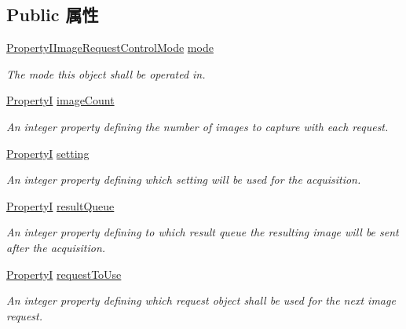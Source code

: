 \subsection*{Public 属性}
\begin{DoxyCompactItemize}
\item 
\hyperlink{group___common_interface_ga2dbb98d2580189d140e11115331f0416}{Property\+I\+Image\+Request\+Control\+Mode} \hyperlink{classmv_i_m_p_a_c_t_1_1acquire_1_1_image_request_control_a4fb0601747fb8feca1eaaed923faab37}{mode}
\begin{DoxyCompactList}\small\item\em The mode this object shall be operated in. \end{DoxyCompactList}\item 
\hyperlink{group___common_interface_ga12d5e434238ca242a1ba4c6c3ea45780}{Property\+I} \hyperlink{classmv_i_m_p_a_c_t_1_1acquire_1_1_image_request_control_a552b30507980db8ad253bc773cb83991}{image\+Count}
\begin{DoxyCompactList}\small\item\em An integer property defining the number of images to capture with each request. \end{DoxyCompactList}\item 
\hyperlink{group___common_interface_ga12d5e434238ca242a1ba4c6c3ea45780}{Property\+I} \hyperlink{classmv_i_m_p_a_c_t_1_1acquire_1_1_image_request_control_acf18030a40a4c3ea66a14097f81a2652}{setting}
\begin{DoxyCompactList}\small\item\em An integer property defining which setting will be used for the acquisition. \end{DoxyCompactList}\item 
\hypertarget{classmv_i_m_p_a_c_t_1_1acquire_1_1_image_request_control_a9a5ed0f41db0291bc13ebe37e09fb84d}{\hyperlink{group___common_interface_ga12d5e434238ca242a1ba4c6c3ea45780}{Property\+I} \hyperlink{classmv_i_m_p_a_c_t_1_1acquire_1_1_image_request_control_a9a5ed0f41db0291bc13ebe37e09fb84d}{result\+Queue}}\label{classmv_i_m_p_a_c_t_1_1acquire_1_1_image_request_control_a9a5ed0f41db0291bc13ebe37e09fb84d}

\begin{DoxyCompactList}\small\item\em An integer property defining to which result queue the resulting image will be sent after the acquisition. \end{DoxyCompactList}\item 
\hyperlink{group___common_interface_ga12d5e434238ca242a1ba4c6c3ea45780}{Property\+I} \hyperlink{classmv_i_m_p_a_c_t_1_1acquire_1_1_image_request_control_acb01d358421ecad7b28f3de692c4868d}{request\+To\+Use}
\begin{DoxyCompactList}\small\item\em An integer property defining which request object shall be used for the next image request. \end{DoxyCompactList}\end{DoxyCompactItemize}
